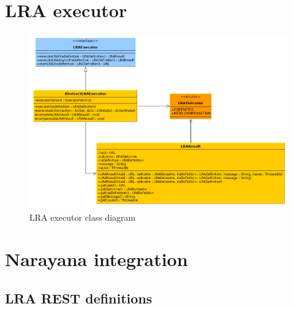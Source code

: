 \documentclass[oneside,
  digital, %
  table,   %
  lof,     %
  lot,     %
]{fithesis3}
\begin{document}
\section{LRA executor}

\begin{figure}[h]
    \begin{center}
        \includegraphics[trim=5cm 0 0 -2cm,width=1.2\textwidth]{images/classDiagrams/lra-executor.png}
    \end{center}
    \caption{LRA executor class diagram}
    \label{fig:lra-executor-class-diagram}
\end{figure}

\clearpage

\section{Narayana integration}

\subsection{LRA REST definitions}
\end{document}
